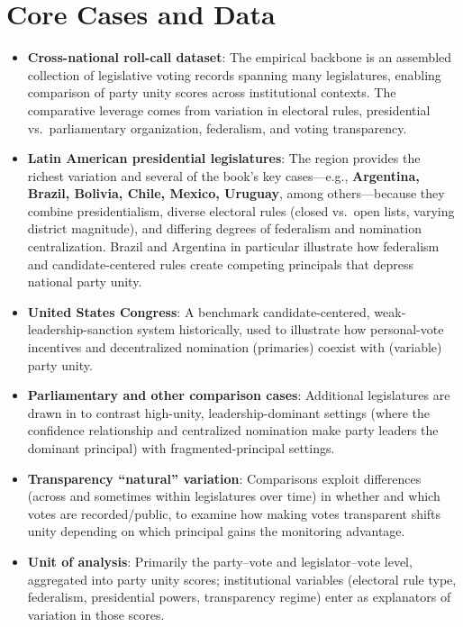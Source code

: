 \documentclass[12pt]{article}
\begin{document}
\section{Core Cases and Data}

\begin{itemize}[leftmargin=*, itemsep=4pt]
    \item \textbf{Cross-national roll-call dataset}: The empirical backbone is an assembled collection of legislative voting records spanning many legislatures, enabling comparison of party unity scores across institutional contexts. The comparative leverage comes from variation in electoral rules, presidential vs.\ parliamentary organization, federalism, and voting transparency.
    \item \textbf{Latin American presidential legislatures}: The region provides the richest variation and several of the book's key cases---e.g., \textbf{Argentina, Brazil, Bolivia, Chile, Mexico, Uruguay}, among others---because they combine presidentialism, diverse electoral rules (closed vs.\ open lists, varying district magnitude), and differing degrees of federalism and nomination centralization. Brazil and Argentina in particular illustrate how federalism and candidate-centered rules create competing principals that depress national party unity.
    \item \textbf{United States Congress}: A benchmark candidate-centered, weak-leadership-sanction system historically, used to illustrate how personal-vote incentives and decentralized nomination (primaries) coexist with (variable) party unity.
    \item \textbf{Parliamentary and other comparison cases}: Additional legislatures are drawn in to contrast high-unity, leadership-dominant settings (where the confidence relationship and centralized nomination make party leaders the dominant principal) with fragmented-principal settings.
    \item \textbf{Transparency ``natural'' variation}: Comparisons exploit differences (across and sometimes within legislatures over time) in whether and which votes are recorded/public, to examine how making votes transparent shifts unity depending on which principal gains the monitoring advantage.
    \item \textbf{Unit of analysis}: Primarily the party--vote and legislator--vote level, aggregated into party unity scores; institutional variables (electoral rule type, federalism, presidential powers, transparency regime) enter as explanators of variation in those scores.
\end{itemize}
\end{document}
